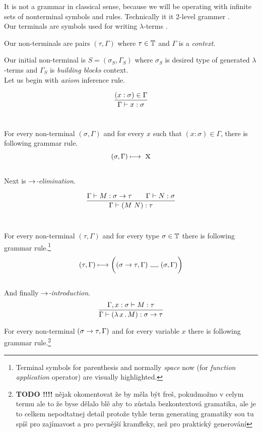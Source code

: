 \documentclass[12pt,a4paper]{report}
\newcommand{\Lets}{Let us\xspace}
\newcommand{\lterms}{$\lambda$-terms\xspace}
\newcommand{\tur}[3]{#1\vdash{}#2:#3}
\newcommand\Vtextvisiblespace[1][.3em]{%
  \mbox{\kern.06em\vrule height.3ex}%
  \vbox{\hrule width#1}%
  \hbox{\vrule height.3ex}}
\begin{document}
It is not a grammar in classical sense, because we will be operating with infinite sets of nonterminal symbols and rules. Technically it it
2-level grammer \cite{todo}.\\

Our terminals are symbols used for writing \lterms 
.%

Our non-terminals are pairs $(\tau,\Gamma)$ where 
$\tau \in \mathbb{T}$ and $\Gamma$ is a \textit{context}.

Our initial non-terminal is $S = (\sigma_S,\Gamma_S)$
where $\sigma_S$ is desired type of generated \lterms and
$\Gamma_S$ is \textit{building blocks} context. \\

\Lets begin with \textit{axiom} inference rule.

$$
\ruleI { (x:\sigma) \in \Gamma }
       { \tur{\Gamma}{x}{\sigma} }
$$~


For every non-terminal $(\sigma,\Gamma)$ 
and for every $x$ such that $(x:\sigma) \in \Gamma$,
there is following grammar rule.
$$ ( \sigma , \Gamma )  \longmapsto \mbox{ {\Large x}} $$ \\

Next is \textit{$\rightarrow$-elimination}.

$$
\ruleII{ \tur{\Gamma}{M}{\sigma \ar \tau} }
       { \tur{\Gamma}{N}{\sigma} }
       { \tur{\Gamma}{(M~N)}{\tau} }
$$~

For every non-terminal $(\tau,\Gamma)$ 
and for every type $\sigma \in \mathbb{T}$ 
there is following grammar rule.\footnote{ 
Terminal symbols for parenthesis and normally {\it space} 
now \textvisiblespace \quad (for {\it function application} operator) 
are visually highlighted. } 
$$
	( \tau , \Gamma )  \gar
	\bigg( ( \sigma \rightarrow \tau , \Gamma ) 
	\mbox{ \Vtextvisiblespace[1em] } ( \sigma , \Gamma ) \bigg)
$$\\

And finally {\it $\rightarrow$-introduction}. 
$$
\ruleI { \tur{\Gamma,x:\sigma}{M}{\tau} }
       { \tur{\Gamma}{\lamb{x}{M}}{\sigma \ar \tau} }
$$

For every non-terminal $(\sigma \rightarrow \tau,\Gamma)$
and for every variable $x$
there is following grammar rule.\footnote{
\textbf{TODO !!!!} nějak okomentovat že by měla být freš,
pokudmožno v celym termu ale to že byse dělalo blě aby to
zůstala bezkontextová gramatika, ale je to celkem nepodtatnej detail
protože tyhle term generating gramatiky sou tu spíš
pro zajímavost a pro pevnější kramfleky, než pro praktický 
generování}
 
\end{document}
